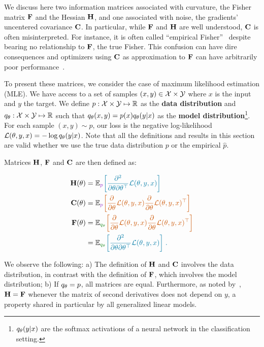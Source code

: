 We discuss here two information matrices associated with curvature, the Fisher matrix ${\mathbf{F}}$ and the Hessian ${\mathbf{H}}$, and one associated with noise, the gradients' uncentered covariance ${\mathbf{C}}$. In particular, while ${\mathbf{F}}$ and ${\mathbf{H}}$ are well understood, ${\mathbf{C}}$ is often misinterpreted. For instance, it is often called ``empirical Fisher''~\citep{martens2014new} despite bearing no relationship to ${\mathbf{F}}$, the true Fisher. This confusion can have dire consequences and optimizers using ${\mathbf{C}}$ as approximation to ${\mathbf{F}}$ can have arbitrarily poor performance~\citep{kunstner2019limitations}.

To present these matrices, we consider the case of maximum likelihood estimation (MLE). We have access to a set of samples $(x,y) \in {\mathcal{X}} \times {\mathcal{Y}}$ where $x$ is the input and $y$ the target. We define $p: {\mathcal{X}} \times {\mathcal{Y}} \mapsto {\mathbb{R}}$ as the \textbf{data distribution} and $q_\theta: {\mathcal{X}} \times {\mathcal{Y}} \mapsto {\mathbb{R}}$ such that $q_\theta(x,y) = p(x) q_\theta(y|x)$ as the \textbf{model distribution}\footnote{$q_\theta(y|x)$ are the softmax activations of a neural network in the classification setting.}.
For each sample $(x, y) \sim p$, our loss is the negative log-likelihood $\mathcal{L}(\theta, y,x) = - \log q_\theta(y|x)$.
Note that all the definitions and results in this section are valid whether we use the true data distribution $p$ or the empirical $\hat{p}$.

Matrices ${\mathbf{H}}$, ${\mathbf{F}}$ and ${\mathbf{C}}$ are then defined as:

\begin{align}
\rmH(\theta) &= \E_{\color{darkorchid}{p}}\color{cerulean}{\left[\frac{\partial^2 }{\partial \theta \partial \theta^\top} \mathcal{L}(\theta, y,x)\right]} \label{eq:def_h}\\
\rmC(\theta) &= \E_{\color{darkorchid}{p}}\color{burntorange}{\left[\frac{\partial}{\partial \theta }\mathcal{L}(\theta, y,x) \frac{\partial}{\partial \theta }\mathcal{L}(\theta, y,x)^\top\right]} \label{eq:def_c}\\
\rmF(\theta) &= \E_{\color{dartmouthgreen}{q_\theta}}\color{burntorange}{\left[\frac{\partial}{\partial \theta }\mathcal{L}(\theta, y,x) \frac{\partial}{\partial \theta }\mathcal{L}(\theta, y,x)^\top\right]} \label{eq:def_f1}\\
&= \E_{\color{dartmouthgreen}{q_\theta}}\color{cerulean}{\left[\frac{\partial^2 }{\partial \theta \partial \theta^\top} \mathcal{L}(\theta, y,x)\right]}  \; .\label{eq:def_f2}
\end{align}

We observe the following: a) The definition of ${\mathbf{H}}$ and ${\mathbf{C}}$ involves the data distribution, in contrast with the definition of ${\mathbf{F}}$, which involves the model distribution; b) If $q_\theta = p$, all matrices are equal. Furthermore, as noted by~\citet{martens2014new}, ${\mathbf{H}} = {\mathbf{F}}$ whenever the matrix of second derivatives does not depend on $y$, a property shared in particular by all generalized linear models.

